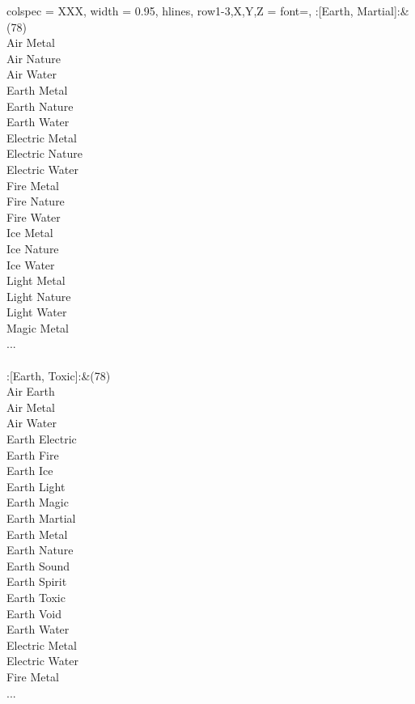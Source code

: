 \begin{longtblr}[
	caption = {2v2 Defending Weak},
	label = {2v2-Defending-Weak},
]{
	colspec = {XXX}, width = 0.95\linewidth,
	hlines,
	row{1-3,X,Y,Z} = {font=\bfseries},
}
	:[Earth, Martial]:&{(78)\\
	Air Metal \\
	Air Nature \\
	Air Water \\
	Earth Metal \\
	Earth Nature \\
	Earth Water \\
	Electric Metal \\
	Electric Nature \\
	Electric Water \\
	Fire Metal \\
	Fire Nature \\
	Fire Water \\
	Ice Metal \\
	Ice Nature \\
	Ice Water \\
	Light Metal \\
	Light Nature \\
	Light Water \\
	Magic Metal \\
	...\\
	}\\

	:[Earth, Toxic]:&{(78)\\
	Air Earth \\
	Air Metal \\
	Air Water \\
	Earth Electric \\
	Earth Fire \\
	Earth Ice \\
	Earth Light \\
	Earth Magic \\
	Earth Martial \\
	Earth Metal \\
	Earth Nature \\
	Earth Sound \\
	Earth Spirit \\
	Earth Toxic \\
	Earth Void \\
	Earth Water \\
	Electric Metal \\
	Electric Water \\
	Fire Metal \\
	...\\
	}\\


\end{longtblr}
